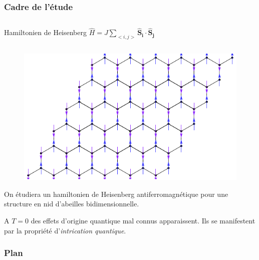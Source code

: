 \documentclass[10pt,a4paper]{beamer}
\newcommand{\h}{\ensuremath{\hat{H}}\xspace}
\newcommand{\1}{\ensuremath{\ket{\om_1\bom_1}}\xspace}
\newcommand{\2}{\ensuremath{\ket{\om_2\bom_2}}\xspace}
\begin{document}
\begin{frame}
\frametitle{Cadre de l'étude}

\begin{columns}
\begin{column}{10cm}
\begin{block}{Hamiltonien de Heisenberg}
\centering
$\h = J\sum_{<i,j>}\mathbf{\hat S_i}\cdot\mathbf{\hat S_j}$
\end{block}
\end{column}
\end{columns}

\begin{figure}[htp]
	\centering
	\includegraphics[scale=0.60]{vector_img/spins_struc_nid_abeilles.pdf}
\end{figure}
On étudiera un hamiltonien de Heisenberg antiferromagnétique pour une structure en nid d'abeilles bidimensionnelle.

A $T=0$ des effets d'origine quantique mal connus apparaissent. Ils se manifestent par la propriété d'\emph{intrication quantique}.
\end{frame}

\begin{frame}
\frametitle{Plan}
\tableofcontents
\end{frame}
\end{document}
